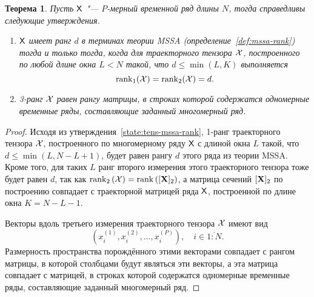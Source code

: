\documentclass[specialist,
  substylefile=spbu.rtx,
subf,href,colorlinks=true, 12pt]{disser}
\theoremstyle{plain}
\newtheorem{theorem}{Теорема}
\theoremstyle{definition}
\newtheorem{definition}{Определение}[section]
\theoremstyle{remark}
\begin{document}
\begin{theorem}
  \label{state:hosvd-mssa-rang}
  Пусть $\mathsf{X}$ "--- $P$-мерный временной ряд длины $N$, тогда справедливы следующие утверждения.
  \begin{enumerate}
    \item $\mathsf{X}$ имеет ранг $d$ в терминах теории \emph{MSSA} (определение~\ref{def:mssa-rank})
      тогда и только тогда, когда для траекторного тензора $\mathcal{X}$, построенного по любой длине окна
      $L<N$ такой, что $d \leqslant\min(L, K)$ выполняется
      \[\operatorname{rank}_1(\mathcal{X}) = \operatorname{rank}_2(\mathcal{X}) = d.\]
    \item 3-ранг $\mathcal{X}$ равен рангу матрицы,
      в строках которой содержатся одномерные временные ряды, составляющие заданный
      многомерный ряд.
  \end{enumerate}
\end{theorem}
\begin{proof}
  Исходя из утверждения~\ref{state:tens-mssa-rank}, 1-ранг
  траекторного тензора $\mathcal{X}$, построенного по многомерному ряду $\mathsf{X}$ с длиной окна
  $L$ такой, что $d \leqslant\min(L, N-L+1)$,
  будет равен рангу $d$ этого ряда из теории MSSA.
  Кроме того, для таких $L$ ранг второго измерения этого траекторного тензора
  тоже будет равен $d$, так как $\operatorname{rank}_2\left(\mathcal{X}\right) =
  \operatorname{rank}\left([\mathbf{X}]_2\right)$,
  а матрица сечений $[\mathbf{X}]_2$ по построению совпадает с траекторной матрицей ряда $\mathsf{X}$, построенной по длине
  окна $K = N - L - 1$.

  Векторы вдоль третьего измерения траекторного тензора $\mathcal{X}$ имеют вид
  \[
    \left(x_i^{(1)}, x_i^{(2)}, \ldots, x_i^{(P)}\right), \quad i \in \overline{1:N}.
  \]
  Размерность пространства порождённого этими векторами совпадает с рангом матрицы,
  в которой столбцами будут являться эти векторы, а эта матрица совпадает с матрицей, в строках которой содержатся одномерные временные ряды, составляющие заданный многомерный ряд.
\end{proof}
\end{document}
